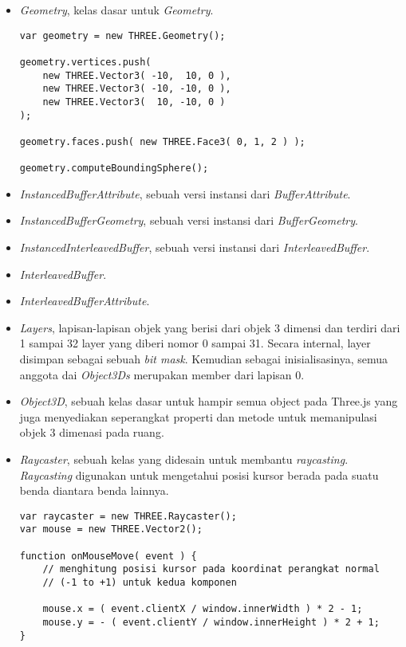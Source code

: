 \begin{itemize}
\begin{itemize}
	\item{\it Geometry}, kelas dasar untuk {\it Geometry}.
\begin{lstlisting}
var geometry = new THREE.Geometry();

geometry.vertices.push(
	new THREE.Vector3( -10,  10, 0 ),
	new THREE.Vector3( -10, -10, 0 ),
	new THREE.Vector3(  10, -10, 0 )
);

geometry.faces.push( new THREE.Face3( 0, 1, 2 ) );

geometry.computeBoundingSphere();
\end{lstlisting}

	\item{\it InstancedBufferAttribute}, sebuah versi instansi dari {\it BufferAttribute}.
	
	\item{\it InstancedBufferGeometry}, sebuah versi instansi dari {\it BufferGeometry}.
	
	\item{\it InstancedInterleavedBuffer}, sebuah versi instansi dari {\it InterleavedBuffer}.
	
	\item{\it InterleavedBuffer}.
	
	\item{\it InterleavedBufferAttribute}.
	
	\item{\it Layers}, lapisan-lapisan objek yang berisi dari objek 3 dimensi dan terdiri dari 1 sampai 32 layer yang diberi nomor 0 sampai 31. Secara internal, layer disimpan sebagai sebuah {\it bit mask}. Kemudian sebagai inisialisasinya, semua anggota dai {\it Object3Ds} merupakan member dari lapisan 0.
	\item{\it Object3D}, sebuah kelas dasar untuk hampir semua object pada Three.js yang juga menyediakan seperangkat properti dan metode untuk memanipulasi objek 3 dimenasi pada ruang.
	\item{\it Raycaster}, sebuah kelas yang didesain untuk membantu {\it raycasting}. {\it Raycasting} digunakan untuk mengetahui posisi kursor berada pada suatu benda diantara benda lainnya.
	
\begin{lstlisting}
var raycaster = new THREE.Raycaster();
var mouse = new THREE.Vector2();

function onMouseMove( event ) {
	// menghitung posisi kursor pada koordinat perangkat normal
	// (-1 to +1) untuk kedua komponen

	mouse.x = ( event.clientX / window.innerWidth ) * 2 - 1;
	mouse.y = - ( event.clientY / window.innerHeight ) * 2 + 1;
}


\end{lstlisting}
\end{itemize}
\end{itemize}
